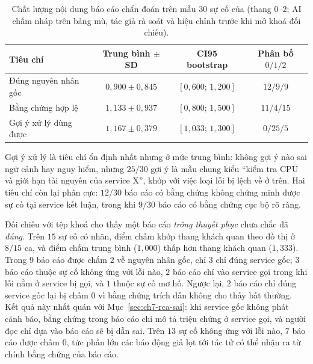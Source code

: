 \begin{table}[H]
  \centering
  \caption[Chất lượng nội dung báo cáo chẩn đoán trên mẫu 30 sự cố]{Chất lượng nội dung báo cáo chẩn đoán trên mẫu $30$ sự cố của  (thang $0$--$2$; AI chấm nháp trên bảng mù, tác giả rà soát và hiệu chỉnh trước khi mở khoá đối chiếu).}
  \label{tab:ch7-human}
  \tblfont
  \tblsetup
  \setlength{\tabcolsep}{4pt}
  \begin{tabularx}{\linewidth}{|Y|c|c|c|}
    \hline
    \textbf{Tiêu chí} & \textbf{Trung bình $\pm$ SD} & \textbf{CI95 bootstrap} & \textbf{Phân bố $0 / 1 / 2$} \\
    \hline
    Đúng nguyên nhân gốc & $0{,}900 \pm 0{,}845$ & $[0{,}600;\, 1{,}200]$ & $12 / 9 / 9$ \\
    \hline
    Bằng chứng hợp lệ & $1{,}133 \pm 0{,}937$ & $[0{,}800;\, 1{,}500]$ & $11 / 4 / 15$ \\
    \hline
    Gợi ý xử lý dùng được & $1{,}167 \pm 0{,}379$ & $[1{,}033;\, 1{,}300]$ & $0 / 25 / 5$ \\
    \hline
  \end{tabularx}
\end{table}

Gợi ý xử lý là tiêu chí ổn định nhất nhưng ở mức trung bình: không gợi ý nào sai ngữ cảnh hay nguy hiểm, nhưng $25/30$ gợi ý là mẫu chung kiểu ``kiểm tra CPU và giới hạn tài nguyên của service X'', khớp với việc loại lỗi bị lệch về  ở trên. Hai tiêu chí còn lại phân cực: $12/30$ báo cáo có bằng chứng không chứng minh được sự cố tại service kết luận, trong khi $9/30$ báo cáo có bằng chứng cục bộ rõ ràng.

Đối chiếu với tệp khoá cho thấy một báo cáo \emph{trông thuyết phục} chưa chắc đã \emph{đúng}. Trên $15$ sự cố có nhãn, điểm chấm khớp thang khách quan theo đồ thị ở $8/15$ ca, và điểm chấm trung bình ($1{,}000$) thấp hơn thang khách quan ($1{,}333$). Trong $9$ báo cáo được chấm $2$ về nguyên nhân gốc, chỉ $3$ chỉ đúng service gốc; $3$ báo cáo thuộc sự cố không ứng với lỗi nào, $2$ báo cáo chỉ vào service gọi trong khi lỗi nằm ở service bị gọi, và $1$ thuộc sự cố mơ hồ. Ngược lại, $2$ báo cáo chỉ đúng service gốc lại bị chấm $0$ vì bằng chứng trích dẫn không cho thấy bất thường. %
Kết quả này nhất quán với Mục~\ref{sec:ch7-rca-sai}: khi service gốc không phát cảnh báo, bằng chứng trong báo cáo chỉ mô tả triệu chứng ở service gọi, và người đọc chỉ dựa vào báo cáo sẽ bị dẫn sai. Trên $13$ sự cố không ứng với lỗi nào, $7$ báo cáo được chấm $0$, tức phần lớn các báo động giả lọt tới tác tử  có thể nhận ra từ chính bằng chứng của báo cáo.

